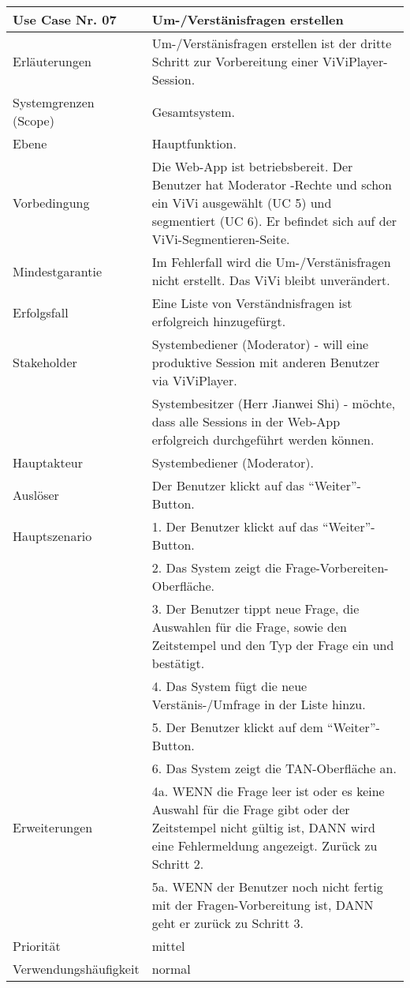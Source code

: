 \begin{tabularx}{\linewidth}{|l|X|}
	\hline
	Use Case Nr. 07			& \textbf{Um-/Verstänisfragen erstellen} \\ \hline
	Erläuterungen			& Um-/Verstänisfragen erstellen ist der dritte Schritt zur 
							  Vorbereitung einer ViViPlayer-Session. \\ \hline
	Systemgrenzen (Scope)	& Gesamtsystem. \\ \hline
	Ebene					& Hauptfunktion. \\ \hline
	Vorbedingung			& Die Web-App ist betriebsbereit. Der Benutzer hat Moderator
							  -Rechte und schon ein ViVi ausgewählt (UC 5) und segmentiert (UC 6). Er befindet sich auf der ViVi-Segmentieren-Seite. \\ \hline
	Mindestgarantie			& Im Fehlerfall wird die Um-/Verstänisfragen nicht erstellt. Das ViVi 
							  bleibt unverändert. \\ \hline
	Erfolgsfall    			& Eine Liste von Verständnisfragen ist erfolgreich hinzugefürgt.
							  \\ \hline
	Stakeholder				& Systembediener (Moderator) - will eine produktive Session mit 
							  anderen Benutzer via ViViPlayer. \\
							& Systembesitzer (Herr Jianwei Shi) - möchte, dass alle Sessions 
							  in der Web-App erfolgreich durchgeführt werden können. \\ \hline
	Hauptakteur				& Systembediener (Moderator). \\ \hline
	Auslöser				& Der Benutzer klickt auf das ``Weiter''-Button. \\ \hline	
	Hauptszenario			& 1. Der Benutzer klickt auf das ``Weiter''-Button. \\  
							& 2. Das System zeigt die Frage-Vorbereiten-Oberfläche. \\
							& 3. Der Benutzer tippt neue Frage, die Auswahlen für die 
							  Frage, sowie den Zeitstempel und den Typ der Frage ein und 
							  bestätigt. \\ 
							& 4. Das System fügt die neue Verstänis-/Umfrage in der Liste 
							  hinzu. \\ 
							& 5. Der Benutzer klickt auf dem ``Weiter''-Button. \\ 
							& 6. Das System zeigt die TAN-Oberfläche an. \\ \hline
	Erweiterungen			& 4a. WENN die Frage leer ist oder es keine Auswahl für die 
							  Frage gibt oder der Zeitstempel nicht gültig ist, DANN wird eine 
							  Fehlermeldung angezeigt. Zurück zu Schritt 2. \\ 
							& 5a. WENN der Benutzer noch nicht fertig mit der 
							  Fragen-Vorbereitung ist, DANN geht er zurück zu Schritt 3. \\ \hline
	Priorität				& mittel \\ \hline
	Verwendungshäufigkeit	& normal \\ \hline
\end{tabularx}